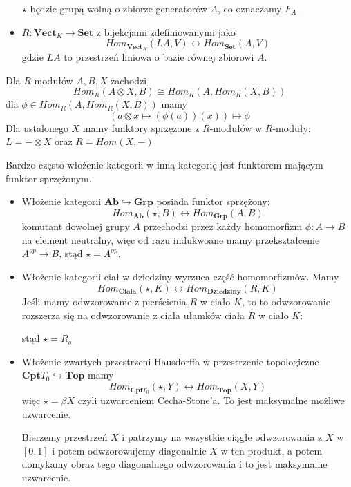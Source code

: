 \begin{example}
\begin{itemize}
        $\star$ będzie grupą wolną o zbiorze generatorów $A$, co oznaczamy $F_A$.
      \item $R:\mathbf{Vect}_K\to\mathbf{Set}$ z bijekcjami zdefiniowanymi jako
        $$Hom_{\mathbf{Vect}_K}(LA,V)\longleftrightarrow Hom_{\mathbf{Set}}(A,V)$$
        gdzie $LA$ to przestrzeń liniowa o bazie równej zbiorowi $A$.
    \end{itemize}
  \item Dla $R$-modułów $A,B,X$ zachodzi
        $$Hom_R(A\otimes X, B)\cong Hom_R(A,Hom_R(X,B))$$
        dla $\phi\in Hom_R(A,Hom_R(X,B))$ mamy
        $$(a\otimes x\mapsto (\phi(a))(x))\mapsto \phi$$
        Dla ustalonego $X$ mamy funktory sprzężone z $R$-modułów w $R$-moduły: $L=-\otimes X$ oraz $R=Hom(X,-)$
  \item Bardzo często włożenie kategorii w inną kategorię jest funktorem mającym funktor sprzężonym.
    \begin{itemize}
      \item Włożenie kategorii $\mathbf{Ab}\hookrightarrow \mathbf{Grp}$ posiada funktor sprzężony:
      $$Hom_{\mathbf{Ab}}(\star, B)\longleftrightarrow Hom_{\mathbf{Grp}}(A, B)$$
      komutant dowolnej grupy $A$ przechodzi przez każdy homomorfizm $\phi:A\to B$ na element neutralny, więc od razu indukwoane mamy przekształcenie $A^{op}\to B$, stąd $\star=A^{op}$.
    \item Włożenie kategorii ciał w dziedziny wyrzuca część homomorfizmów. Mamy
      $$Hom_{\mathbf{Ciala}}(\star,K)\longleftrightarrow Hom_{\mathbf{Dziedziny}}(R,K)$$
      Jeśli mamy odwzorowanie z pierścienia $R$ w ciało $K$, to to odwzorowanie rozszerza się na odwzorowanie z ciała ułamków ciała $R$ w ciało $K$:
  
      \begin{center}\end{center}
  
      stąd $\star=R_o$
    \item Włożenie zwartych przestrzeni Hausdorffa w przestrzenie topologiczne $\mathbf{Cpt}T_0\hookrightarrow \mathbf{Top}$ mamy
      $$Hom_{\mathbf{Cpf}T_0}(\star, Y)\longleftrightarrow Hom_{\mathbf{Top}}(X,Y)$$
      więc $\star=\beta X$ czyli uzwarceniem Cecha-Stone'a. To jest maksymalne możliwe uzwarcenie. 
  
      Bierzemy przestrzeń $X$ i patrzymy na wszystkie ciągłe odwzorowania z $X$ w $[0,1]$ i potem odwzorowujemy diagonalnie $X$ w ten produkt, a potem domykamy obraz tego diagonalnego odwzorowania i to jest maksymalne uzwarcenie.
  \end{itemize}
\end{example}


